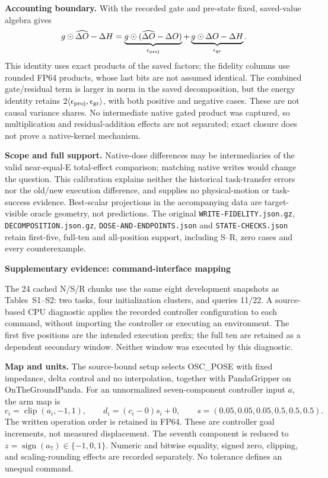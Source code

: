 \documentclass[conference]{IEEEtran}
\begin{document}
\noindent\textbf{Accounting boundary.} With the recorded gate and pre-state fixed, saved-value algebra gives
\[
 g\odot\widehat{\Delta O}-\Delta H
 =\underbrace{g\odot(\widehat{\Delta O}-\Delta O)}_{\epsilon_{\rm proj}}
 +\underbrace{g\odot\Delta O-\Delta H}_{\epsilon_{\rm gr}}.
\]
This identity uses exact products of the saved factors; the fidelity columns use rounded FP64 products, whose last bits are not assumed identical. The combined gate/residual term is larger in norm in the saved decomposition, but the energy identity retains $2\langle\epsilon_{\rm proj},\epsilon_{\rm gr}\rangle$, with both positive and negative cases. These are not causal variance shares. No intermediate native gated product was captured, so multiplication and residual-addition effects are not separated; exact closure does not prove a native-kernel mechanism.

\noindent\textbf{Scope and full support.} Native-dose differences may be intermediaries of the valid near-equal-E total-effect comparison; matching native writes would change the question. This calibration explains neither the historical task-transfer errors nor the old/new execution difference, and supplies no physical-motion or task-success evidence. Best-scalar projections in the accompanying data are target-visible oracle geometry, not predictions. The original \texttt{WRITE-FIDELITY.json.gz}, \texttt{DECOMPOSITION.json.gz}, \texttt{DOSE-AND-ENDPOINTS.json} and \texttt{STATE-CHECKS.json} retain first-five, full-ten and all-position support, including S--R, zero cases and every counterexample.
\clearpage
\begin{center}{\Large\bfseries Supplementary evidence: command-interface mapping}\end{center}
\noindent The 24 cached N/S/R chunks use the same eight development snapshots as Tables~S1--S2: two tasks, four initialization clusters, and queries 11/22. A source-based CPU diagnostic applies the recorded controller configuration to each command, without importing the controller or executing an environment. The first five positions are the intended execution prefix; the full ten are retained as a dependent secondary window. Neither window was executed by this diagnostic.

\noindent\textbf{Map and units.} The source-bound setup selects OSC\_POSE with fixed impedance, delta control and no interpolation, together with PandaGripper on OnTheGroundPanda. For an unnormalized seven-component controller input $a$, the arm map is
\[
 c_i=\operatorname{clip}(a_i,-1,1),\qquad
 d_i=(c_i-0)s_i+0,\qquad
 s=(0.05,0.05,0.05,0.5,0.5,0.5).
\]
The written operation order is retained in FP64. These are controller goal increments, not measured displacement. The seventh component is reduced to $z=\operatorname{sign}(a_7)\in\{-1,0,1\}$. Numeric and bitwise equality, signed zero, clipping, and scaling-rounding effects are recorded separately. No tolerance defines an unequal command.
\end{document}
